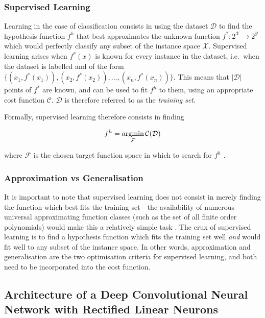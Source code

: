 \documentclass[a4paper,11pt]{article}
\begin{document}
\subsubsection{Supervised Learning}

Learning in the case of classification consists in using the dataset $\mathcal{D}$ to find the hypothesis function $f^{h}$ that best approximates the unknown function $f^{*} : 2^{\mathcal{X}} \rightarrow 2^{\mathcal{Y}}$ which would perfectly classify any subset of the instance space $\mathcal{X}$. Supervised learning arises when $f^{*}(x)$ is known for every instance in the dataset, i.e.\ when the dataset is labelled and of the form $\{(x_{1},f^{*}(x_{1})),(x_{2},f^{*}(x_{2})), ..., (x_{n},f^{*}(x_{n}))\}$. This means that $|\mathcal{D}|$ points of $f^{*}$ are known, and can be used to fit $f^{h}$ to them, using an appropriate cost function $\mathcal{C}$. $\mathcal{D}$ is therefore referred to as the \textit{training set}. 

Formally, supervised learning therefore consists in finding

\begin{equation}
\label{learning: optimisation equation}
  f^{h} = \operatornamewithlimits{argmin}\limits_{\mathcal{F}}\operatorname{\mathcal{C}}(\mathcal{D})
\end{equation}
  
where $\mathcal{F}$ is the chosen target function space in which to search for $f^{h}$ . \\

\subsubsection{Approximation vs Generalisation}

It is important to note that supervised learning does not consist in merely finding the function which best fits the training set - the availability of numerous universal approximating function classes (such as the set of all finite order polynomials) would make this a relatively simple task \cite{univ-approx}. The crux of supervised learning is to find a hypothesis function which fits the training set well \textit{and} would fit well to any subset of the instance space. In other words, approximation and generalisation are the two optimisation criteria for supervised learning, and both need to be incorporated into the cost function.\\

\subsection{Architecture of a Deep Convolutional Neural Network with Rectified Linear Neurons}
\end{document}
